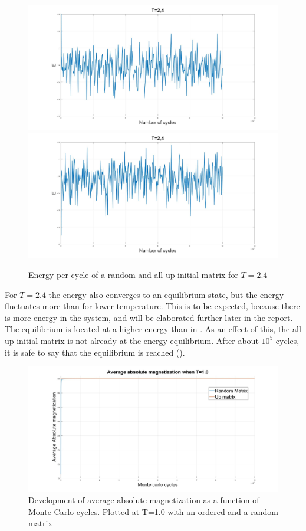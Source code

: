 \documentclass[10pt,a4paper]{article}
\begin{document}
\begin{figure} [H]
\centerline{
\includegraphics[scale=0.15]{RANDOMenergy24.jpg}
\includegraphics[scale=0.15]{UPenergy24.jpg}
}
\caption{Energy per cycle of a random and all up initial matrix for $T=2.4$}
\label{fig:EnergyPerCycle24}
\end{figure}

\noindent For $T=2.4$ the energy also converges to an equilibrium state, but the energy fluctuates more than for lower temperature. This is to be expected, because there is more energy in the system, and will be elaborated further later in the report. The equilibrium is located at a higher energy than in . As an effect of this, the all up initial matrix is not already at the energy equilibrium. After about $10^5$ cycles, it is safe to say that the equilibrium is reached ().

\begin{figure} [H]
\centerline{
\includegraphics[scale=0.3]{avgMagn1.jpg}
}
\caption{Development of average absolute magnetization as a function of Monte Carlo cycles. Plotted at T=1.0 with an ordered and a random matrix}
\label{fig:AverageMagn1}
\end{figure}
\end{document}
